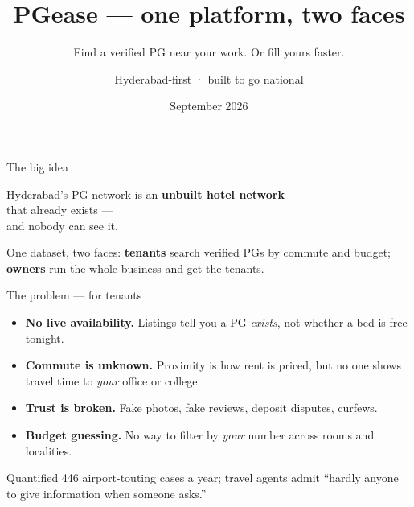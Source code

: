 \documentclass[aspectratio=169]{beamer}
\title{PGease — one platform, two faces}
\subtitle{Find a verified PG near your work. Or fill yours faster.}
\author{Hyderabad-first · built to go national}
\date{September 2026}
\begin{document}
\begin{frame}
  \titlepage
\end{frame}

\begin{frame}{The big idea}
  \begin{center}
    \Large
    Hyderabad's PG network is an \textbf{unbuilt hotel network}\\ that already exists — \\
    and nobody can see it.
  \end{center}
  \vspace{0.4cm}
  \begin{block}{}
    One dataset, two faces: \textbf{tenants} search verified PGs by commute and budget;
    \textbf{owners} run the whole business and get the tenants.
  \end{block}
\end{frame}

\begin{frame}{The problem — for tenants}
  \begin{itemize}
    \item \textbf{No live availability.} Listings tell you a PG \emph{exists}, not whether a bed is free tonight.
    \item \textbf{Commute is unknown.} Proximity is how rent is priced, but no one shows travel time to \emph{your} office or college.
    \item \textbf{Trust is broken.} Fake photos, fake reviews, deposit disputes, curfews.
    \item \textbf{Budget guessing.} No way to filter by \emph{your} number across rooms and localities.
  \end{itemize}
  \vspace{0.2cm}
  \begin{alertblock}{Quantified}
    446 airport-touting cases a year; travel agents admit ``hardly anyone to give information when someone asks.''
  \end{alertblock}
\end{frame}
\end{document}
